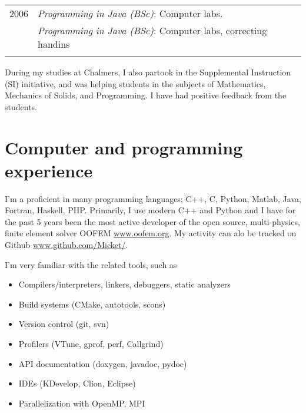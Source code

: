 \documentclass[a4paper,10pt]{article} %
\begin{document}
{\begin{tabular}{r|p{11cm}}

\textsc{2006} 
              & \emph{Programming in Java (BSc)}: \footnotesize{Computer labs.}\\
              & \emph{Programming in Java (BSc)}: \footnotesize{Computer labs, correcting handins}\\
\multicolumn{2}{c}{} \\

% 

\end{tabular}

During my studies at Chalmers, I also partook in the Supplemental Instruction (SI) initiative, and was helping students in the subjects of Mathematics, Mechanics of Solids, and Programming.
I have had positive feedback from the students.


\newpage
\section{Computer and programming experience}

I'm a proficient in many programming languages; C++, C, Python, Matlab, Java, Fortran, Haskell, PHP.
Primarily, I use modern C++ and Python and I have for the past 5 years been the most active developer of the open source, multi-physics, finite element solver OOFEM \url{www.oofem.org}. My activity can alo be tracked on Github \url{www.github.com/Micket/}.

I'm very familiar with the related tools, such as
\begin{itemize}
 \item Compilers/interpreters, linkers, debuggers, static analyzers
 \item Build systems (CMake, autotools, scons)
 \item Version control (git, svn)
 \item Profilers (VTune, gprof, perf, Callgrind)
 \item API documentation (doxygen, javadoc, pydoc)
 \item IDEs (KDevelop, Clion, Eclipse)
 \item Parallelization with OpenMP, MPI
\end{itemize}

}
\end{document}
